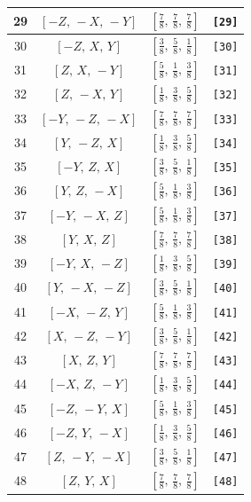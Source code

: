 \documentclass[fleqn,8pt]{jsarticle}
\begin{document}
\begin{longtable}{cccc}
29 & $\left[ - Z,\, - X,\, - Y \right]$ & $\left[ \frac{7}{8},\, \frac{7}{8},\, \frac{7}{8} \right]$ & {\tt [29]} \\ \hline
30 & $\left[ - Z,\, X,\, Y \right]$ & $\left[ \frac{3}{8},\, \frac{5}{8},\, \frac{1}{8} \right]$ & {\tt [30]} \\ \hline
31 & $\left[ Z,\, X,\, - Y \right]$ & $\left[ \frac{5}{8},\, \frac{1}{8},\, \frac{3}{8} \right]$ & {\tt [31]} \\ \hline
32 & $\left[ Z,\, - X,\, Y \right]$ & $\left[ \frac{1}{8},\, \frac{3}{8},\, \frac{5}{8} \right]$ & {\tt [32]} \\ \hline
33 & $\left[ - Y,\, - Z,\, - X \right]$ & $\left[ \frac{7}{8},\, \frac{7}{8},\, \frac{7}{8} \right]$ & {\tt [33]} \\ \hline
34 & $\left[ Y,\, - Z,\, X \right]$ & $\left[ \frac{1}{8},\, \frac{3}{8},\, \frac{5}{8} \right]$ & {\tt [34]} \\ \hline
35 & $\left[ - Y,\, Z,\, X \right]$ & $\left[ \frac{3}{8},\, \frac{5}{8},\, \frac{1}{8} \right]$ & {\tt [35]} \\ \hline
36 & $\left[ Y,\, Z,\, - X \right]$ & $\left[ \frac{5}{8},\, \frac{1}{8},\, \frac{3}{8} \right]$ & {\tt [36]} \\ \hline
37 & $\left[ - Y,\, - X,\, Z \right]$ & $\left[ \frac{5}{8},\, \frac{1}{8},\, \frac{3}{8} \right]$ & {\tt [37]} \\ \hline
38 & $\left[ Y,\, X,\, Z \right]$ & $\left[ \frac{7}{8},\, \frac{7}{8},\, \frac{7}{8} \right]$ & {\tt [38]} \\ \hline
39 & $\left[ - Y,\, X,\, - Z \right]$ & $\left[ \frac{1}{8},\, \frac{3}{8},\, \frac{5}{8} \right]$ & {\tt [39]} \\ \hline
40 & $\left[ Y,\, - X,\, - Z \right]$ & $\left[ \frac{3}{8},\, \frac{5}{8},\, \frac{1}{8} \right]$ & {\tt [40]} \\ \hline
41 & $\left[ - X,\, - Z,\, Y \right]$ & $\left[ \frac{5}{8},\, \frac{1}{8},\, \frac{3}{8} \right]$ & {\tt [41]} \\ \hline
42 & $\left[ X,\, - Z,\, - Y \right]$ & $\left[ \frac{3}{8},\, \frac{5}{8},\, \frac{1}{8} \right]$ & {\tt [42]} \\ \hline
43 & $\left[ X,\, Z,\, Y \right]$ & $\left[ \frac{7}{8},\, \frac{7}{8},\, \frac{7}{8} \right]$ & {\tt [43]} \\ \hline
44 & $\left[ - X,\, Z,\, - Y \right]$ & $\left[ \frac{1}{8},\, \frac{3}{8},\, \frac{5}{8} \right]$ & {\tt [44]} \\ \hline
45 & $\left[ - Z,\, - Y,\, X \right]$ & $\left[ \frac{5}{8},\, \frac{1}{8},\, \frac{3}{8} \right]$ & {\tt [45]} \\ \hline
46 & $\left[ - Z,\, Y,\, - X \right]$ & $\left[ \frac{1}{8},\, \frac{3}{8},\, \frac{5}{8} \right]$ & {\tt [46]} \\ \hline
47 & $\left[ Z,\, - Y,\, - X \right]$ & $\left[ \frac{3}{8},\, \frac{5}{8},\, \frac{1}{8} \right]$ & {\tt [47]} \\ \hline
48 & $\left[ Z,\, Y,\, X \right]$ & $\left[ \frac{7}{8},\, \frac{7}{8},\, \frac{7}{8} \right]$ & {\tt [48]} \\
\end{longtable}
\end{document}
